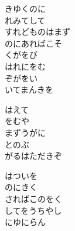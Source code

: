 \documentclass[10pt,b5j]{tarticle} %
\begin{document}
\vspace{1.5em} %
\newcommand{\linespace}{0.5em} %
\newcommand{\blocksize}{0.5\hsize} %
\begin{enumerate} %
    \begin{minipage}[c]{\blocksize}
    
        \vspace{\linespace}
        \item
        きゆくのに\\
        れみてして\\
        すれどものはまず\\
        のにあればこそ\\
        くがをび\\
        はれにをむ\\
        ぞがをい\\
        いてまんきを
        
        \vspace{\linespace}
        \item
        はえて\\
        をむや\\
        まずうがに\\
        とのぶ\\
        がるはただきぞ
        
        \vspace{\linespace}
        \item
        はついを\\
        のにきく\\
        さればこのをく\\
        してをうちやし\\
        にゆにらん
        

\end{minipage}
\end{enumerate}
\end{document}
